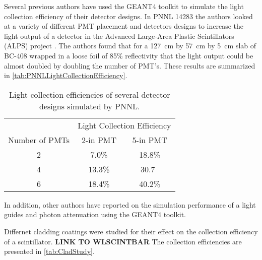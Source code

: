 Several previous authors have used the GEANT4 toolkit to simulate the light collection efficiency of their detector designs.
In PNNL 14283 the authors looked at a variety of different PMT placement and detectors designs to increase the light output of a detector in the Advanced Large-Area Plastic Scintillators (ALPS) project \cite{pnnl_14283}.
The authors found that for a \SI{127}{\cm} by \SI{57}{\cm} by \SI{5}{\cm} slab of BC-408 wrapped in a loose foil of 85\% reflectivity that the light output could be almost doubled by doubling the number of PMT's.
These results are summarized in \autoref{tab:PNNLLightCollectionEfficiency}.
\begin{table}
  \centering
  \caption[PNNL Light Collection Efficiencies]{Light collection efficiencies of several detector designs simulated by PNNL\cite{pnnl_14283}.}
  \label{tab:PNNLLightCollectionEfficiency}
  \begin{tabular}{c|c c}
  \toprule
  & \multicolumn{2}{c}{Light Collection Efficiency} \\
  Number of PMTs  & 2-in PMT & 5-in PMT \\
  \midrule
  2 & 7.0\% & 18.8\% \\
  4 & 13.3\% & 30.7\ \\
  6 & 18.4\% & 40.2\% \\
  \bottomrule
  \end{tabular}
\end{table}
In addition, other authors have reported on the simulation performance of a light guides and photon attenuation using the GEANT4 toolkit.

Differnet cladding coatings were studied for their effect on the collection efficiency of a scintillator.
\textbf{LINK TO WLSCINTBAR}
The collection efficiencies are presented in \autoref{tab:CladStudy}.


